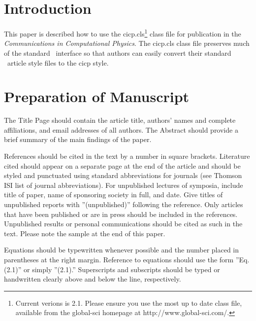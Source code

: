 \documentclass[mathpazo]{cicp}
\begin{document}
\maketitle


\section{Introduction}
This paper is described how to use the {\sf cicp.cls}\footnote{Current verions is 2.1. Please
ensure you use the most up to date class file, available from the
global-sci homepage at http://www.global-sci.com/.} class file for publication
in the {\it Communications in Computational Physics}.
The {\sf cicp.cls} class file preserves much of the standard \LaTeXe \ interface
so that authors can easily convert their standard \LaTeXe \ {\sf article} style
files to the {\sf cicp} style.

\section{Preparation of Manuscript}
The Title Page should contain the article title, authors' names and complete affiliations,
and email addresses of all authors. The Abstract should provide a brief summary of the main findings of the paper.

\medskip

References should be cited in the text by a number in square brackets. Literature cited should appear on a separate page at the
end of the article and should be styled and punctuated using standard abbreviations for journals
(see Thomson ISI list of journal abbreviations).
 For unpublished lectures of symposia,
include title of paper, name of sponsoring society in full, and date. Give titles of unpublished reports with ''(unpublished)''
following the reference. Only articles that have been published or are in press should be included in the references.
Unpublished results or personal communications should be cited as such in the text.
Please note the sample at the end of this paper.



Equations should be typewritten whenever possible and the number placed in parentheses at the right margin.
Reference to equations should use the form ''Eq. (2.1)'' or simply ''(2.1).''
Superscripts and subscripts should be typed or handwritten clearly above and below the line, respectively.
\end{document}
